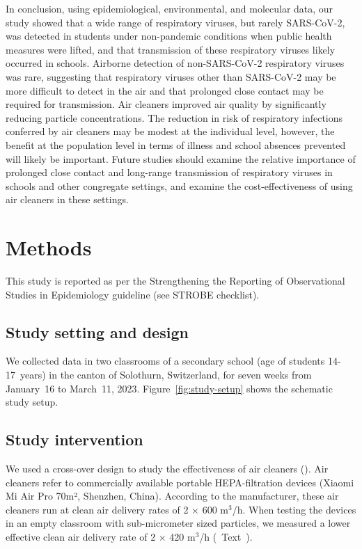 \documentclass[fleqn,11pt]{wlscirep}
\begin{document}
In conclusion, using epidemiological, environmental, and molecular data, our study showed that a wide range of respiratory viruses, but rarely SARS-CoV-2, was detected in students under non-pandemic conditions when public health measures were lifted, and that transmission of these respiratory viruses likely occurred in schools. Airborne detection of non-SARS-CoV-2 respiratory viruses was rare, suggesting that respiratory viruses other than SARS-CoV-2 may be more difficult to detect in the air and that prolonged close contact may be required for transmission. Air cleaners improved air quality by significantly reducing particle concentrations. The reduction in risk of respiratory infections conferred by air cleaners may be modest at the individual level, however, the benefit at the population level in terms of illness and school absences prevented will likely be important. Future studies should examine the relative importance of prolonged close contact and long-range transmission of respiratory viruses in schools and other congregate settings, and examine the cost-effectiveness of using air cleaners in these settings.

\clearpage

\section*{Methods}

This study is reported as per the Strengthening the Reporting of Observational Studies in Epidemiology guideline (see STROBE checklist).

\subsection*{Study setting and design} 

\noindent We collected data in two classrooms of a secondary school (age of students 14-17~years) in the canton of Solothurn, Switzerland, for seven weeks from January~16 to March~11, 2023. Figure~\ref{fig:study-setup} shows the schematic study setup. 

\subsection*{Study intervention} 

\noindent We used a cross-over design to study the effectiveness of air cleaners (). Air cleaners refer to commercially available portable HEPA-filtration devices (Xiaomi Mi Air Pro 70m², Shenzhen, China). According to the manufacturer, these air cleaners run at clean air delivery rates of 2$\,\times\,$600 m$^{3}$/h. When testing the devices in an empty classroom with sub-micrometer sized particles, we measured a lower effective clean air delivery rate of 2$\,\times\,$420 m$^{3}$/h (\supp~Text~). 
 
\end{document}
